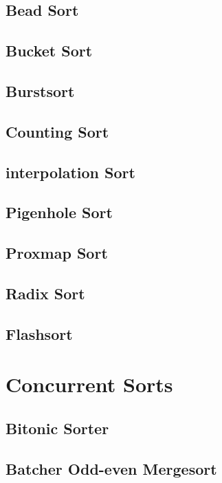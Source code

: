 				\subsection{Bead Sort}

				\subsection{Bucket Sort}

				\subsection{Burstsort}

				\subsection{Counting Sort}

				\subsection{interpolation Sort}

				\subsection{Pigenhole Sort}

				\subsection{Proxmap Sort}

				\subsection{Radix Sort}

				\subsection{Flashsort}

			\section{Concurrent Sorts}
				\subsection{Bitonic Sorter}

				\subsection{Batcher Odd-even Mergesort}

